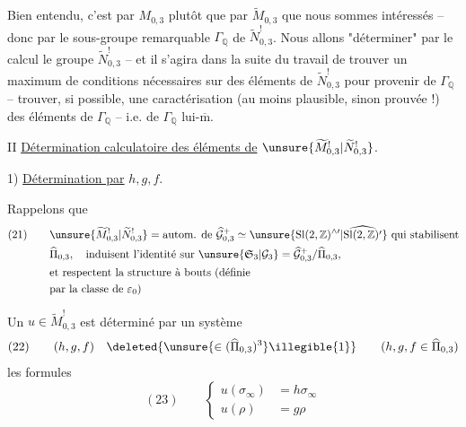 Bien entendu, c'est par $M_{0,3}$  plutôt que par $\widetilde M_{0,3}$  que nous sommes intéressés -- donc par le sous-groupe remarquable $\Gamma_{\mathbb Q}$ de $\widetilde N_{0,3}^{!}$. Nous allons "déterminer" par le calcul le groupe $\widetilde N_{0,3}^{!}$ -- et il s'agira dans la suite du travail de trouver un maximum de conditions nécessaires sur des éléments de $\widetilde N_{0,3}^{!}$ pour provenir de $\Gamma_{\mathbb Q}$ --  trouver, si possible, une caractérisation (au moins plausible, sinon prouvée !) des éléments de $\Gamma_{\mathbb Q}$ -- i.e. de $\Gamma_{\mathbb Q}$ lui-$\overline{\mathrm m}$.


II \uline{Détermination calculatoire des éléments de} $\unsure{\widetilde M_{0,3}^{!}|\widetilde N_{0,3}^{!}}$.

1) \uline{Détermination par} $h,g,f$.


Rappelons que
\[
\begin{aligned}
(21)\qquad
&\unsure{\widetilde M_{0,3}^{!}|\widetilde N_{0,3}^{!}}
=\text{autom. de }\widehat{\mathcal G}_{0,3}^{+}
\simeq\unsure{\mathrm{Sl}(2,\mathbb Z)^{\wedge\prime}|\widehat{\mathrm{Sl}(2,\mathbb Z)^{\prime}}}
\text{ qui stabilisent}\\
&\widehat\Pi_{0,3},\quad\text{induisent l'identité sur }
\unsure{\mathfrak S_3|\mathcal G_3}
=\widehat{\mathcal G}_{0,3}^{+}/\widehat\Pi_{0,3},\\
&\text{et respectent la structure à bouts (définie}\\
&\text{par la classe de }\varepsilon_0\text{)}
\end{aligned}
\]

Un $u\in\widetilde M_{0,3}^{!}$ est déterminé par un système
\[
(22)\qquad (h,g,f)\quad
\deleted{\unsure{\in(\widehat\Pi_{0,3})^{3}}\illegible{1}}
\qquad(h,g,f\in\widehat\Pi_{0,3})
\]
 les formules
\[
(23)\qquad
\left\{\begin{aligned}
u(\sigma_\infty)&=h\sigma_\infty\\
u(\rho)&=g\rho
\end{aligned}\right.
\]

